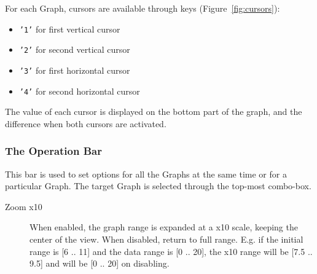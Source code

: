 \documentclass[a4paper,11pt]{article}
\begin{document}
For each Graph, cursors are available through keys (Figure~\ref{fig:cursors}):
\begin{itemize}
\item \texttt{'1'} for first vertical cursor
\item \texttt{'2'} for second vertical cursor
\item \texttt{'3'} for first horizontal cursor
\item \texttt{'4'} for second horizontal cursor
\end{itemize}
The value of each cursor is displayed on the bottom part of the graph, and the difference when both cursors are activated.

\subsubsection{The Operation Bar}

This bar is used to set options for all the Graphs at the same time or for a particular Graph.
The target Graph is selected through the top-most combo-box.
\begin{description}
\item[Zoom x10] When enabled, the graph range is expanded at a x10 scale, keeping the center of the view. When disabled, return to full range. E.g. if the initial range is [6 .. 11] and the data range is [0 .. 20], the x10 range will be [7.5 .. 9.5] and will be [0 .. 20] on disabling.
\end{description}
\end{document}
